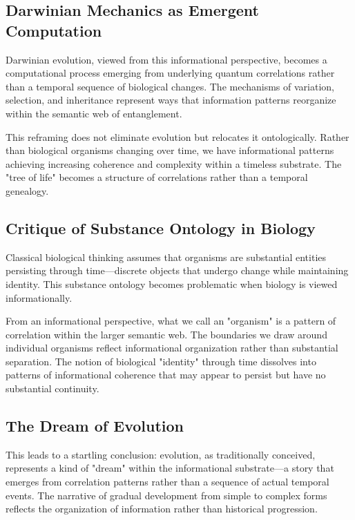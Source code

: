 \documentclass[12pt]{article}
\begin{document}
\subsection{Darwinian Mechanics as Emergent Computation}

Darwinian evolution, viewed from this informational perspective, becomes a computational process emerging from underlying quantum correlations rather than a temporal sequence of biological changes. The mechanisms of variation, selection, and inheritance represent ways that information patterns reorganize within the semantic web of entanglement.

This reframing does not eliminate evolution but relocates it ontologically. Rather than biological organisms changing over time, we have informational patterns achieving increasing coherence and complexity within a timeless substrate. The "tree of life" becomes a structure of correlations rather than a temporal genealogy.

\subsection{Critique of Substance Ontology in Biology}

Classical biological thinking assumes that organisms are substantial entities persisting through time—discrete objects that undergo change while maintaining identity. This substance ontology becomes problematic when biology is viewed informationally.

From an informational perspective, what we call an "organism" is a pattern of correlation within the larger semantic web. The boundaries we draw around individual organisms reflect informational organization rather than substantial separation. The notion of biological "identity" through time dissolves into patterns of informational coherence that may appear to persist but have no substantial continuity.

\subsection{The Dream of Evolution}

This leads to a startling conclusion: evolution, as traditionally conceived, represents a kind of "dream" within the informational substrate—a story that emerges from correlation patterns rather than a sequence of actual temporal events. The narrative of gradual development from simple to complex forms reflects the organization of information rather than historical progression.
\end{document}
